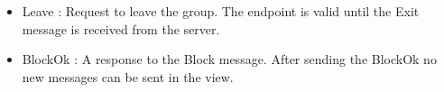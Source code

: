 \begin{itemize}
\item{Leave} : Request to leave the group. The endpoint is valid until
  the Exit message is received from the server. 
\begin{FormatTable}
\end{FormatTable}

\item{BlockOk} : A response to the Block message. After sending the
  BlockOk no new messages can be sent in the view. 
\begin{FormatTable}
\end{FormatTable}
\end{itemize}

